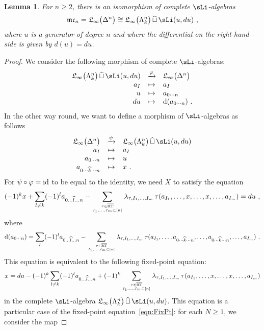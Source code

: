 \documentclass[twoside, 10pt]{amsart}
\newtheorem{lemma}{Lemma}[section]
\begin{document}
\begin{lemma}\label{lemm:Fundamental}
For $n\geqslant 2$, there is an isomorphism of complete $\sLi$-algebras 
\[
\mc_n=\Li\big(\De{n}\big)\cong \Li\big(\Ho{k}{n}\big)\,\widehat{\sqcup}\, \sLi(u, du)\ ,
\]
where $u$ is a generator of degree $n$ and where the differential on the right-hand side is given by $d(u)=du$.
\end{lemma}

\begin{proof}
We consider the following morphism of complete $\sLi$-algebras:
\[
\begin{array}{rcl}
\Li\big(\Ho{k}{n}\big)\,\widehat{\sqcup}\, \sLi(u, du)&  \xrightarrow{\varphi}&\Li\big(\De{n}\big)\\
a_I&\mapsto& a_I\\
u&\mapsto& a_{0\cdots n}\\
du&\mapsto& \d(a_{0\cdots n})\ .
\end{array}
\]
In the other way round, we want to define a morphism of $\sLi$-algebras as follows 
\[
\begin{array}{rcl}
\Li\big(\De{n}\big)&  \xrightarrow{\psi}& \Li\big(\Ho{k}{n}\big)\,\widehat{\sqcup}\, \sLi(u, du)\\
a_I&\mapsto& a_I\\
a_{0\cdots n}&\mapsto& u\\
a_{0\cdots\widehat{k}\cdots n}&\mapsto& x\ .
\end{array}
\]
For $\psi\circ \varphi=\mathrm{id}$ to be equal to the identity, we need $X$ to satisfy the  equation 
\[(-1)^k x+\sum_{l\neq k} (-1)^l a_{0\ldots \widehat{l} \ldots n} - \sum_{\tau \in \overline{\RT}\atop I_1, \ldots, I_m\subset[n]}\lambda_{\tau, I_1, \ldots, I_m}\, \tau(a_{I_1}, \ldots, x, \ldots, x, \ldots, a_{I_m})=du\ ,  
  \]
where 
\[\mathrm{d}(a_{0\cdots n})=\sum_{l} (-1)^l a_{0\ldots \widehat{l} \ldots n}- \sum_{\tau \in \overline{\mathrm{RT}}\atop I_1, \ldots, I_m\subset[n]}\lambda_{\tau, I_1, \ldots, I_m}\, \tau(a_{I_1}, \ldots, a_{0\cdots\widehat{k}\cdots n}, \ldots, a_{0\cdots\widehat{k}\cdots n}, \ldots, a_{I_m})\ .
\]
This equation is equivalent to the following fixed-point equation:
\begin{equation}\label{eq:FixPtMorph}
x=du-(-1)^k\sum_{l\neq k} (-1)^l a_{0\ldots \widehat{l} \ldots n} +(-1)^k \sum_{\tau \in \overline{\mathrm{RT}}\atop I_1, \ldots, I_m\subset[n]}\lambda_{\tau, I_1, \ldots, I_m}\, \tau(a_{I_1}, \ldots, x, \ldots, x, \ldots, a_{I_m})
\end{equation} 
in the complete $\sLi$-algebra $\Li\big(\Ho{k}{n}\big)\,\widehat{\sqcup}\, \sLi(u, du)$. This equation is a particular case of the fixed-point equation~\eqref{eqn:FixPt}: for each $N\geqslant 1$, we consider the  map

\end{proof}
\end{document}
